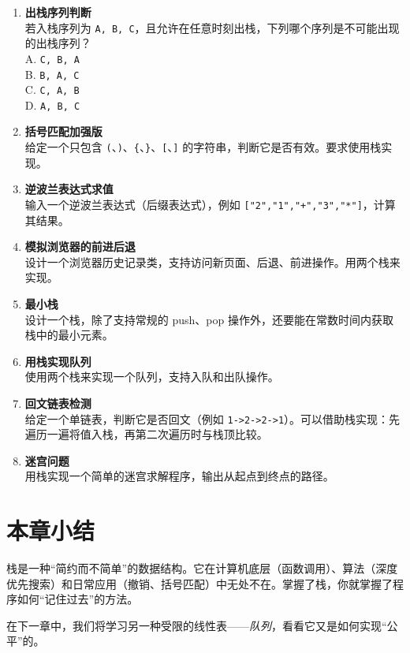 \begin{enumerate}
    \item \textbf{出栈序列判断} \\
    若入栈序列为 \texttt{A, B, C}，且允许在任意时刻出栈，下列哪个序列是不可能出现的出栈序列？ \\
    A. \texttt{C, B, A} \\
    B. \texttt{B, A, C} \\
    C. \texttt{C, A, B} \\
    D. \texttt{A, B, C}

    \item \textbf{括号匹配加强版} \\
    给定一个只包含 \texttt{(}、\texttt{)}、\texttt{\{}、\texttt{\}}、\texttt{[}、\texttt{]} 的字符串，判断它是否有效。要求使用栈实现。

    \item \textbf{逆波兰表达式求值} \\
    输入一个逆波兰表达式（后缀表达式），例如 \texttt{["2","1","+","3","*"]}，计算其结果。

    \item \textbf{模拟浏览器的前进后退} \\
    设计一个浏览器历史记录类，支持访问新页面、后退、前进操作。用两个栈来实现。

    \item \textbf{最小栈} \\
    设计一个栈，除了支持常规的 push、pop 操作外，还要能在常数时间内获取栈中的最小元素。

    \item \textbf{用栈实现队列} \\
    使用两个栈来实现一个队列，支持入队和出队操作。

    \item \textbf{回文链表检测} \\
    给定一个单链表，判断它是否回文（例如 \texttt{1->2->2->1}）。可以借助栈实现：先遍历一遍将值入栈，再第二次遍历时与栈顶比较。

    \item \textbf{迷宫问题} \\
    用栈实现一个简单的迷宫求解程序，输出从起点到终点的路径。
\end{enumerate}

\section*{本章小结}

栈是一种“简约而不简单”的数据结构。它在计算机底层（函数调用）、算法（深度优先搜索）和日常应用（撤销、括号匹配）中无处不在。掌握了栈，你就掌握了程序如何“记住过去”的方法。

在下一章中，我们将学习另一种受限的线性表——\emph{队列}，看看它又是如何实现“公平”的。
